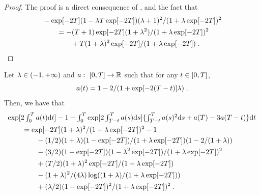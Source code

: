   \begin{proof}
    The proof is a direct consequence of ,  and the fact that
    \begin{align}
      &- \exp[-2T] (1 - \lambda T \exp[-2T]) (\lambda+1)^2/(1 +\lambda \exp[-2T])^2 \\      
      &\qquad =-(T+1)\exp[-2T] (1+\lambda^2)/(1+\lambda\exp[-2T])^2 \\
      &\qquad \qquad + T(1+\lambda)^2\exp[-2T]/(1+\lambda\exp[-2T]) \; . 
    \end{align}
  \end{proof}

  \begin{proposition}
    \label{prop:mean_mean}
        Let $\lambda \in \left(-1, +\infty\right)$ and $a: \ \left[0,T\right] \to \mathbb{R}$ such
  that for any $t \in \left[0,T\right]$,
  \begin{equation}
    a(t) = 1 - 2/(1 + \exp[-2(T-t)]\lambda) \; . 
  \end{equation}
  Then, we have that
  \begin{align}
    &\textstyle{ \exp[2\int_0^T a(t) \mathrm{d}t] - 1 - \int_0^T\exp[2 \int_{T-t}^T a(s) \mathrm{d}s] \{ \int_{T-t}^T a(s)^2 \mathrm{d}s + a(T) - 3 a(T-t) \} \mathrm{d}t } \\
    & \qquad = \exp[-2T] (1+\lambda)^2 /(1+ \lambda\exp[-2T])^2 - 1 \\
    & \qquad \qquad -(1/2)(1+\lambda)  (1 -  \exp[-2T])/(1 + \lambda \exp[-2T])(1 -2/(1+\lambda)) \\
    & \qquad \qquad -(3/2)(1- \exp[-2T])(1 - \lambda^2 \exp[-2T])/(1 + \lambda \exp[-2T])^2 \\
& \qquad \qquad + (T/2)(1+\lambda)^2\exp[-2T]/(1+\lambda\exp[-2T]) \\
    & \qquad \qquad - (1+\lambda)^2/(4\lambda)\log((1+\lambda)/(1 + \lambda \exp[-2T])) \\
    & \qquad \qquad +(\lambda/2)(1-\exp[-2T])^2/(1 + \lambda \exp[-2T])^2 \; .    
  \end{align}

\end{proposition}
